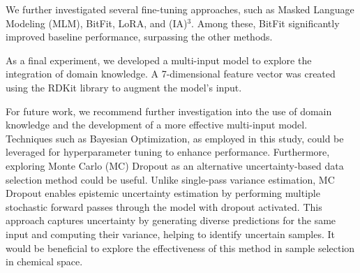 \documentclass[11pt]{article}
\begin{document}
We further investigated several fine-tuning approaches, such as Masked Language Modeling (MLM), BitFit, LoRA, and (IA)$^3$. Among these, BitFit significantly improved baseline performance, surpassing the other methods. 

As a final experiment, we developed a multi-input model to explore the integration of domain knowledge. A 7-dimensional feature vector was created using the RDKit library to augment the model's input. 

For future work, we recommend further investigation into the use of domain knowledge and the development of a more effective multi-input model. Techniques such as Bayesian Optimization, as employed in this study, could be leveraged for hyperparameter tuning to enhance performance. Furthermore, exploring Monte Carlo (MC) Dropout as an alternative uncertainty-based data selection method could be useful. Unlike single-pass variance estimation, MC Dropout enables epistemic uncertainty estimation by performing multiple stochastic forward passes through the model with dropout activated. This approach captures uncertainty by generating diverse predictions for the same input and computing their variance, helping to identify uncertain samples. It would be beneficial to explore the effectiveness of this method in sample selection in chemical space.





\end{document}
